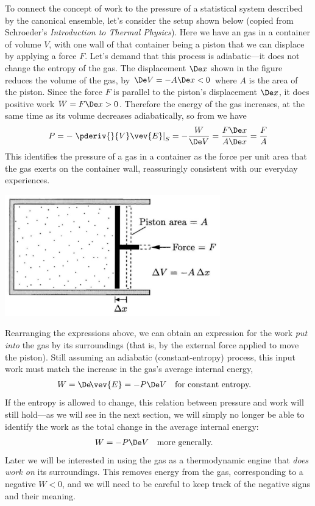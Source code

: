 To connect the concept of work to the pressure of a statistical system described by the canonical ensemble, let's consider the setup shown below (copied from Schroeder's \textit{Introduction to Thermal Physics}).
Here we have an gas in a container of volume $V$, with one wall of that container being a piston that we can displace by applying a force $F$.
Let's demand that this process is adiabatic---it does not change the entropy of the gas.
The displacement $\De x$ shown in the figure reduces the volume of the gas, by $\De V = -A\De x < 0$ where $A$ is the area of the piston.
Since the force $F$ is parallel to the piston's displacement $\De x$, it does positive work $W = F\De x > 0$.
Therefore the energy of the gas increases, at the same time as its volume decreases adiabatically, so from  we have
\begin{equation}
  P = -\left. \pderiv{}{V} \vev{E}\right|_S = -\frac{W}{\De V} = \frac{F\De x}{A\De x} = \frac{F}{A}
\end{equation}
This identifies the pressure of a gas in a container as the force per unit area that the gas exerts on the container wall, reassuringly consistent with our everyday experiences.

\begin{center}
  \includegraphics[width=0.7\textwidth]{figs/unit05_piston.pdf}
\end{center}

Rearranging the expressions above, we can obtain an expression for the work \textit{put into} the gas by its surroundings (that is, by the external force applied to move the piston).
Still assuming an adiabatic (constant-entropy) process, this input work must match the increase in the gas's average internal energy,
\begin{align*}
  W & = \De\!\vev{E} = -P \De V & & \mbox{for constant entropy.}
\end{align*}
If the entropy is allowed to change, this relation between pressure and work will still hold---as we will see in the next section, we will simply no longer be able to identify the work as the total change in the average internal energy:
\begin{align}
  \label{eq:work_constP}
  W & = -P \De V & & \mbox{more generally.}
\end{align}
Later we will be interested in using the gas as a thermodynamic engine that \textit{does work on} its surroundings.
This removes energy from the gas, corresponding to a negative $W < 0$, and we will need to be careful to keep track of the negative signs and their meaning.

